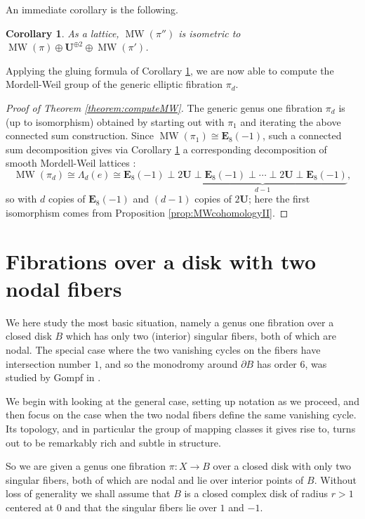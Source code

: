 \documentclass[10pt,letterpaper]{amsart}
\numberwithin{equation}{section}
\def\Eb{\mathbf {E}}
\def\Ub{\mathbf{U}}
\newcommand\MW{\operatorname{MW}}
\newtheorem{corollary}[theorem]{Corollary}
\theoremstyle{remark}
\begin{document}
An immediate corollary is the following.

\begin{corollary}\label{cor:fiberconnectedsum}
As a lattice, $\MW(\pi'')$ is isometric to $\MW(\pi)\oplus \mathbf{U}^{\oplus 2}\oplus \MW(\pi')$.
\end{corollary}

Applying the gluing formula of Corollary \ref{cor:fiberconnectedsum}, we are now able to compute the Mordell-Weil group of the generic elliptic fibration $\pi_d$.

\begin{proof}[Proof of Theorem \ref{theorem:computeMW}]
\label{proof:MWcompute}
The generic genus one fibration $\pi_d$ is (up to isomorphism) 
obtained by  starting out with $\pi_1$ and 
iterating the above connected sum construction. Since $\MW(\pi_1)\cong \Eb_8(-1)$, such a connected sum decomposition gives 
via Corollary \ref{cor:fiberconnectedsum} a corresponding decomposition of smooth Mordell-Weil lattices :
\[
\MW(\pi_d)\cong \Lambda_d(e)\cong  \Eb_8(-1)\perp \underbrace{2\Ub\perp \Eb_8(-1)\perp \cdots  \perp 2\Ub\perp\Eb_8(-1)}_{d-1}, 
\]
so with $d$ copies of $ \Eb_8(-1)$ and $(d-1)$ copies of $2\Ub$; here the first isomorphism comes from Proposition   \ref{prop:MWcohomologyII}.
\end{proof}




\section{Fibrations over a disk with two nodal fibers}
\label{section:2node}
We here study the most basic situation, namely a genus one fibration over a closed disk $B$ which has only two (interior) singular fibers, both of which are nodal. The special case where the two vanishing cycles on the fibers have intersection number $1$, and so the monodromy around $\partial B$ has  order 6, was studied by Gompf in \cite{G}.

We begin with looking at the  general case, setting up notation as we proceed, and then focus on the case when the two nodal fibers define the same vanishing cycle. Its topology, and in particular the group of  mapping classes it gives rise to,  turns out to be remarkably rich and subtle in structure. 

So we are given a genus one fibration $\pi :X\to B$ over a closed disk 
with only two singular fibers, both of which are nodal and lie over interior points of $B$. Without loss of generality we shall assume that 
$B$ is a closed complex disk of radius $r>1$ centered at $0$ and that the singular fibers lie over $1$ and $-1$. 
\end{document}
